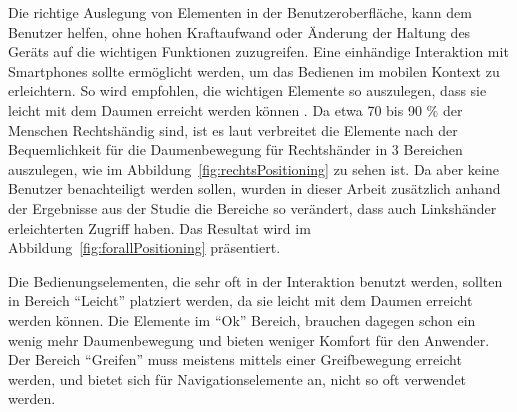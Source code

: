Die richtige Auslegung von Elementen in der Benutzeroberfläche, kann dem Benutzer helfen, ohne hohen Kraftaufwand oder Änderung der Haltung des Geräts auf die wichtigen Funktionen zuzugreifen. Eine einhändige Interaktion mit Smartphones sollte ermöglicht werden, um das Bedienen im mobilen Kontext zu erleichtern. So wird empfohlen, die wichtigen Elemente so auszulegen, dass sie leicht mit dem Daumen erreicht werden können \cite[Seite 209]{mobileFrontier}. Da etwa 70 bis 90 $\%$ der Menschen Rechtshändig sind, ist es laut \cite[Seite 72]{mobileFirst} verbreitet die Elemente nach der Bequemlichkeit für die Daumenbewegung für Rechtshänder in 3 Bereichen auszulegen, wie im Abbildung~\ref{fig:rechtsPositioning} zu sehen ist. Da aber keine Benutzer benachteiligt werden sollen, wurden in dieser Arbeit zusätzlich anhand der Ergebnisse aus der Studie \cite{Park:2010tu} die Bereiche so verändert, dass auch Linkshänder erleichterten Zugriff haben. Das  Resultat wird im Abbildung~\ref{fig:forallPositioning}\cite[Seite 72]{mobileFirst} präsentiert.

Die Bedienungselementen, die sehr oft in der Interaktion benutzt werden, sollten in Bereich “Leicht” platziert werden, da sie leicht mit dem Daumen erreicht werden können. Die Elemente im “Ok” Bereich, brauchen dagegen schon ein wenig mehr Daumenbewegung und bieten weniger Komfort für den Anwender. Der Bereich “Greifen” muss meistens mittels einer Greifbewegung erreicht werden, und bietet sich für Navigationselemente an, nicht so oft verwendet werden.

